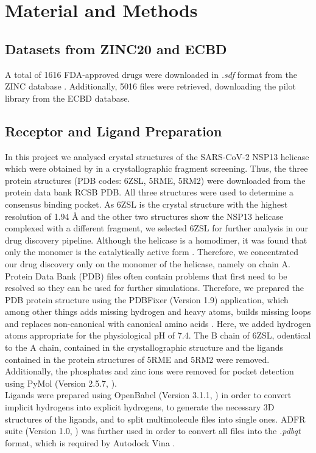 \documentclass[11pt, letterpaper, titlepage]{article}
\renewcommand{\cite}{\parencite}
\begin{document}
\section{Material and Methods}
\subsection{Datasets from ZINC20 and ECBD}
A total of 1616 \ac{FDA}-approved drugs were downloaded in \textit{.sdf} format from the ZINC database \cite{Irwin.2020}. Additionally, 5016 files were retrieved, downloading the pilot library from the ECBD database.

\subsection{Receptor and Ligand Preparation}
In this project we analysed crystal structures of the \ac{SARS-CoV-2} \ac{NSP13} helicase which were obtained by \cite{NSP13_basics} in a crystallographic fragment screening. Thus, the three protein structures (PDB codes: 6ZSL, 5RME, 5RM2) were downloaded from the protein data bank \ac{RCSB PDB}. All three structures were used to determine a consensus binding pocket. As 6ZSL is the crystal structure with the highest resolution of 1.94 {\AA} and the other two structures show the \ac{NSP13} helicase complexed with a different fragment, we selected 6ZSL for further analysis in our drug discovery pipeline. Although the helicase is a homodimer, it was found that only the monomer is the catalytically active form \cite{Berta_2021}. Therefore, we concentrated our drug discovery only on the monomer of the helicase, namely on chain A. \\
Protein Data Bank (PDB) files often contain problems that first need to be resolved so they can be used for further simulations. Therefore, we prepared the PDB protein structure using the PDBFixer (Version 1.9) application, which among other things adds missing hydrogen and heavy atoms, builds missing loops and replaces non-canonical with canonical amino acids \cite{Eastman_2017}. Here, we added hydrogen atoms appropriate for the physiological pH of 7.4. The B chain of 6ZSL, odentical to the A chain, contained in the crystallographic structure and the ligands contained in the protein structures of 5RME and 5RM2 were removed. Additionally, the phosphates and zinc ions were removed for pocket detection  using PyMol (Version 2.5.7, \textcite{PyMOL}). \\ 
Ligands were prepared using OpenBabel (Version 3.1.1, \textcite{OpenBabel}) in order to convert implicit hydrogens into explicit hydrogens, to generate the necessary 3D structures of the ligands, and to split multimolecule files into single ones. ADFR suite (Version 1.0, \textcite{AutoDockFR}) was further used in order to convert all files into the \textit{.pdbqt} format, which is required by Autodock Vina \cite{Trott.2010}. 
\end{document}
